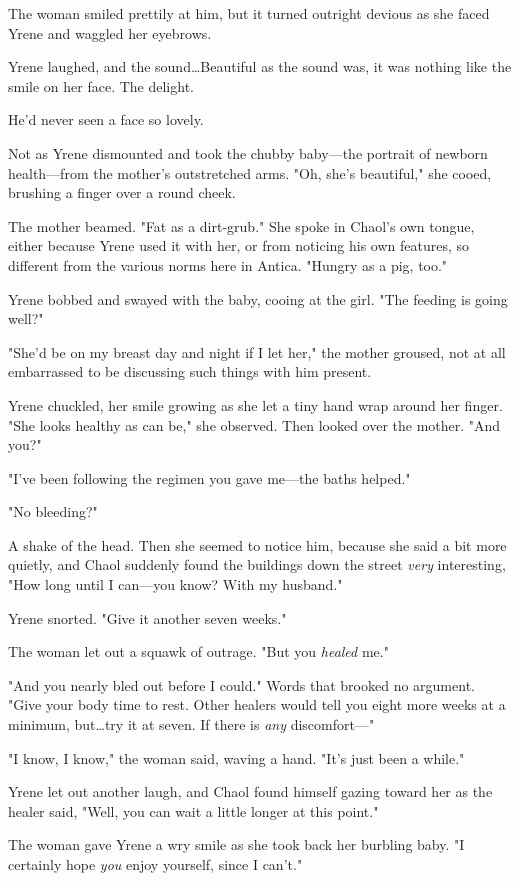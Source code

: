 The woman smiled prettily at him, but it turned outright devious as she faced Yrene and waggled her eyebrows.

Yrene laughed, and the sound\ldots Beautiful as the sound was, it was nothing like the smile on her face.
The delight.

He'd never seen a face so lovely.

Not as Yrene dismounted and took the chubby baby---the portrait of newborn health---from the mother's outstretched arms.
"Oh, she's beautiful," she cooed, brushing a finger over a round cheek.

The mother beamed.
"Fat as a dirt-grub."
She spoke in Chaol's own tongue, either because Yrene used it with her, or from noticing his own features, so different from the various norms here in Antica.
"Hungry as a pig, too."

Yrene bobbed and swayed with the baby, cooing at the girl.
"The feeding is going well?"

"She'd be on my breast day and night if I let her," the mother groused, not at all embarrassed to be discussing such things with him present.

Yrene chuckled, her smile growing as she let a tiny hand wrap around her finger.
"She looks healthy as can be," she observed.
Then looked over the mother.
"And you?"

"I've been following the regimen you gave me---the baths helped."

"No bleeding?"

A shake of the head.
Then she seemed to notice him, because she said a bit more quietly, and Chaol suddenly found the buildings down the street \emph{very} interesting, "How long until I can---you know?
With my husband."

Yrene snorted.
"Give it another seven weeks."

The woman let out a squawk of outrage.
"But you \emph{healed} me."

"And you nearly bled out before I could."
Words that brooked no argument.
"Give your body time to rest.
Other healers would tell you eight more weeks at a minimum, but\ldots try it at seven.
If there is \emph{any} discomfort---"

"I know, I know," the woman said, waving a hand.
"It's just 
been a while."

Yrene let out another laugh, and Chaol found himself gazing toward her as the healer said, "Well, you can wait a little longer at this point."

The woman gave Yrene a wry smile as she took back her burbling baby.
"I certainly hope \emph{you} enjoy yourself, since I can't."

